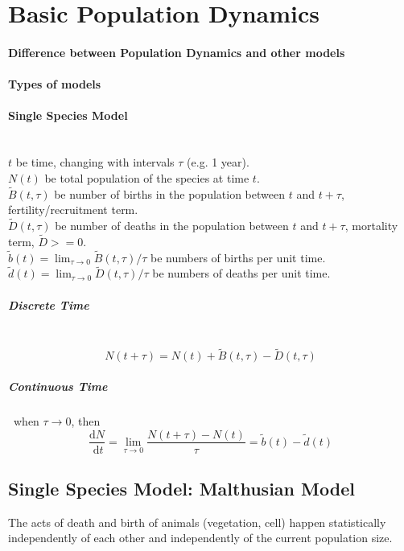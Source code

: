 \section{Basic Population Dynamics}

\paragraph{Difference between Population Dynamics and other models}

\paragraph{Types of models}

\paragraph{Single Species Model}~{\\
$t$ be time, changing with intervals $\tau$ (e.g. 1 year).\\
$N(t)$ be total population of the species at time $t$.\\
$\tilde{B}(t, \tau)$ be number of births in the population between $t$ and $t+\tau$, fertility/recruitment term.\\
$\tilde{D}(t, \tau)$ be number of deaths in the population between $t$ and $t+\tau$, mortality term, $\tilde{D} >= 0$.\\
$\tilde{b}(t)=\lim _{\tau \rightarrow 0} \tilde{B}(t, \tau) / \tau$ be numbers of births per unit time.\\
$\tilde{d}(t)=\lim _{\tau \rightarrow 0} \tilde{D}(t, \tau) / \tau$ be numbers of deaths per unit time.
}

\subparagraph{Discrete Time}~{
\begin{equation}
    N(t+\tau)=N(t)+\tilde{B}(t, \tau)-\tilde{D}(t, \tau)\label{eq1.1}
\end{equation}
}

\subparagraph{Continuous Time}~{when $\tau \rightarrow 0$, then
\begin{equation}
    \frac{\mathrm{d} N}{\mathrm{~d} t}=\lim _{\tau \rightarrow 0} \frac{N(t+\tau)-N(t)}{\tau}=\tilde{b}(t)-\tilde{d}(t)\label{eq1.2}
\end{equation}
}

\newpage
\subsection{Single Species Model: Malthusian Model}
\begin{assumption}
    The acts of death and birth of animals (vegetation, cell) happen statistically independently of each other and independently of the current population size.
\end{assumption}


